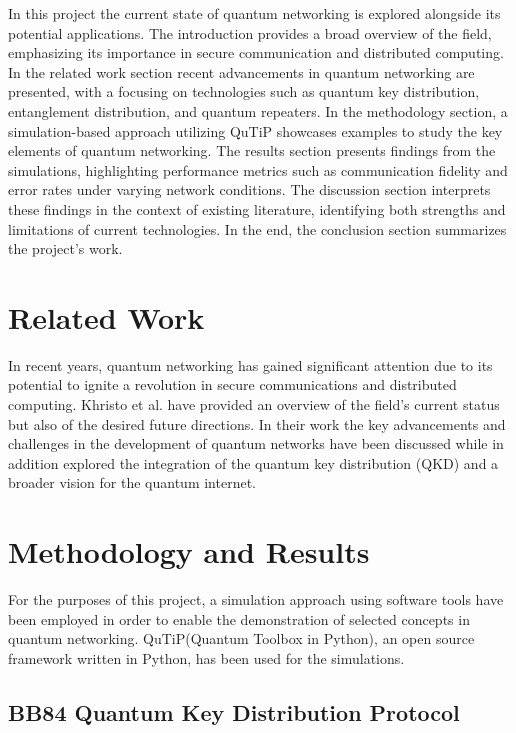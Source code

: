 \documentclass[12pt,a4paper] {report}
\begin{document}
		In this project the current state of quantum networking is explored alongside its potential applications. 
		The introduction provides a broad overview of the field, emphasizing its importance in secure communication and distributed computing. 
		In the related work section recent advancements in quantum networking are presented, with a focusing on technologies such as 
		quantum key distribution, entanglement distribution, and quantum repeaters. 
		In the methodology section, a simulation-based approach utilizing QuTiP showcases examples to study the key elements of quantum networking. 
		The results section presents findings from the simulations, 
		highlighting performance metrics such as communication fidelity and error rates under varying network conditions. 
		The discussion section interprets these findings in the context of existing literature, identifying both strengths and limitations of current technologies. 
		In the end, the conclusion section summarizes the project's work.

	\chapter{Related Work}
		In recent years, quantum networking has gained
		significant attention due to its potential to ignite a revolution in
		secure communications and distributed computing.
		Khristo et al. \cite{Khristo2020} have provided an overview of the field's
		current status but also of the desired future directions.
		In their work the key advancements and challenges in the
		development of quantum networks have been discussed while in addition
		explored the integration of the quantum key distribution (QKD)
		and a broader vision for the quantum internet.


	\chapter{Methodology and Results}
		
		For the purposes of this project, a
		simulation approach using software tools
		have been employed in order to enable the
		demonstration of selected concepts in quantum networking.
		QuTiP(Quantum Toolbox in Python)\cite{qutip}, an open source framework
		written in Python, has been used for the simulations.

		\section{BB84 Quantum Key Distribution Protocol}
\end{document}
